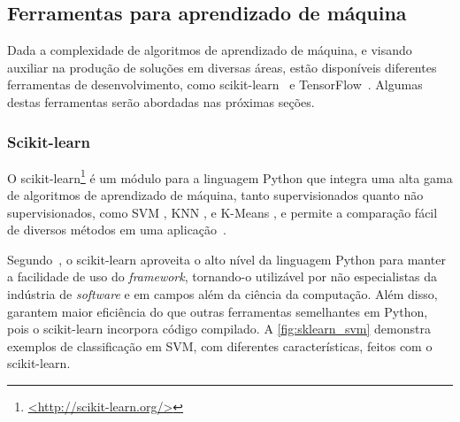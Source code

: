 \subsection{Ferramentas para aprendizado de máquina}\label{sec:ml_tools}

Dada a complexidade de algoritmos de aprendizado de máquina, e visando auxiliar na produção de soluções em diversas áreas, estão disponíveis diferentes ferramentas de desenvolvimento, como scikit-learn~\cite{pedregosa:2011} e TensorFlow~\cite{abadi:2015}. Algumas destas ferramentas serão abordadas nas próximas seções.

\subsubsection{Scikit-learn}\label{sec:ml_sklearn}

O scikit-learn\footnote{\href{http://scikit-learn.org/}{<http://scikit-learn.org/>}} é um módulo para a linguagem Python que integra uma alta gama de algoritmos de aprendizado de máquina, tanto supervisionados quanto não supervisionados, como SVM \cite{cortes:1995svm}, KNN \cite{cover:1967knn}, e K-Means \cite{macqueen:1967kmeans}, e permite a comparação fácil de diversos métodos em uma aplicação~\cite{pedregosa:2011}.

Segundo~, o scikit-learn aproveita o alto nível da linguagem Python para manter a facilidade de uso do \textit{framework}, tornando-o utilizável por não especialistas da indústria de \textit{software} e em campos além da ciência da computação. Além disso,~ garantem maior eficiência do que outras ferramentas semelhantes em Python, pois o scikit-learn incorpora código compilado. A \autoref{fig:sklearn_svm} demonstra exemplos de classificação em SVM, com diferentes características, feitos com o scikit-learn.

